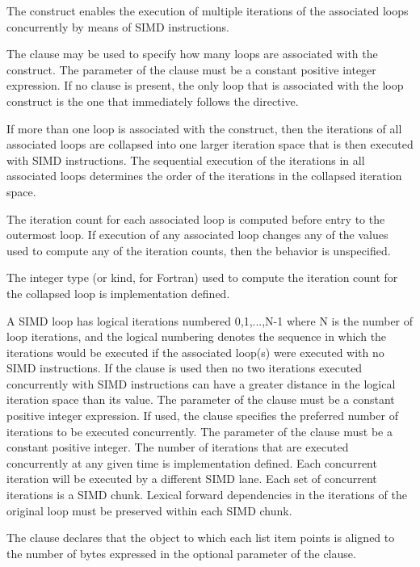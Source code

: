 \descr
The  construct enables the execution of multiple iterations of the associated loops 
concurrently by means of SIMD instructions.

The  clause may be used to specify how many loops are associated with the 
construct. The parameter of the  clause must be a constant positive integer 
expression. If no  clause is present, the only loop that is associated with the 
loop construct is the one that immediately follows the directive.

If more than one loop is associated with the  construct, then the iterations of all 
associated loops are collapsed into one larger iteration space that is then executed with 
SIMD instructions. The sequential execution of the iterations in all associated loops 
determines the order of the iterations in the collapsed iteration space.

The iteration count for each associated loop is computed before entry to the outermost 
loop. If execution of any associated loop changes any of the values used to compute any 
of the iteration counts, then the behavior is unspecified.

The integer type (or kind, for Fortran) used to compute the iteration count for the 
collapsed loop is implementation defined.

A SIMD loop has logical iterations numbered 0,1,...,N-1 where N is the number of loop 
iterations, and the logical numbering denotes the sequence in which the iterations would 
be executed if the associated loop(s) were executed with no SIMD instructions. If the 
 clause is used then no two iterations executed concurrently with SIMD 
instructions can have a greater distance in the logical iteration space than its value. The 
parameter of the  clause must be a constant positive integer expression. 
If used, the  clause specifies the preferred number of iterations to be executed concurrently. 
The parameter of the  clause must be a constant positive integer.
The number of iterations that are executed concurrently at any given time is implementation 
defined. Each concurrent iteration will be executed by a different SIMD lane. Each set 
of concurrent iterations is a SIMD chunk. Lexical forward dependencies in the iterations of the original loop must be preserved within each SIMD chunk.

\ccppspecificstart
The  clause declares that the object to which each list item points is aligned to 
the number of bytes expressed in the optional parameter of the  clause.
\ccppspecificend

